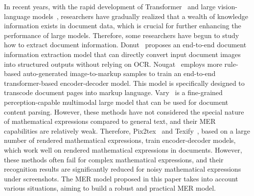 \documentclass[runningheads]{llncs}
\begin{document}
In recent years, with the rapid development of Transformer~\cite{vaswani2017attention} and large vision-language models~\cite{zhu2023minigpt,liu2024visual,dong2024internlm,liu2023improved}, researchers have gradually realized that a wealth of knowledge information exists in document data, which is crucial for further enhancing the performance of large models. Therefore, some researchers have begun to study how to extract document information. Donut~\cite{kim2022ocr} proposes an end-to-end document information extraction model that can directly convert input document images into structured outputs without relying on OCR. Nougat~\cite{blecher2023nougat} employs more rule-based auto-generated image-to-markup samples to train an end-to-end transformer-based encoder-decoder model. This model is specifically designed to transcode document pages into markup language. Vary~\cite{wei2023vary} is a fine-grained perception-capable multimodal large model that can be used for document content parsing. However, these methods have not considered the special nature of mathematical expressions compared to general text, and their MER capabilities are relatively weak. Therefore, Pix2tex~\cite{pix2tex2022} and Texify~\cite{texify2023}, based on a large number of rendered mathematical expressions, train encoder-decoder models, which work well on rendered mathematical expressions in documents. However, these methods often fail for complex mathematical expressions, and their recognition results are significantly reduced for noisy mathematical expressions under screenshots. The MER model proposed in this paper takes into account various situations, aiming to build a robust and practical MER model.
\end{document}
